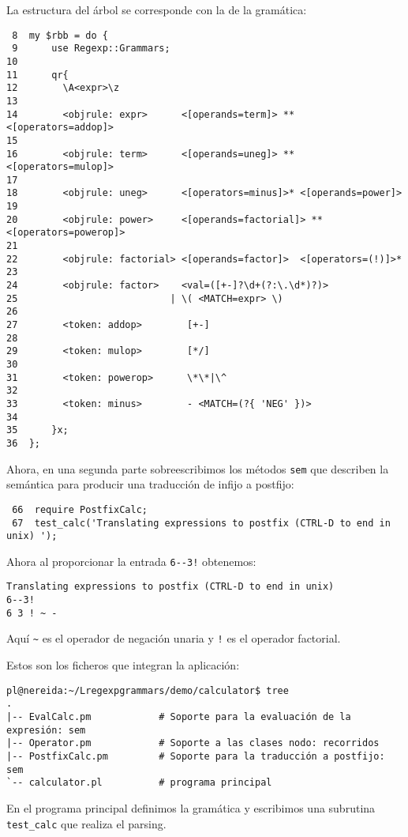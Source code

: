 La estructura del árbol se corresponde con la de la gramática:
\begin{verbatim}
 8  my $rbb = do {
 9      use Regexp::Grammars;
10
11      qr{
12        \A<expr>\z
13
14        <objrule: expr>      <[operands=term]> ** <[operators=addop]>
15
16        <objrule: term>      <[operands=uneg]> ** <[operators=mulop]>
17
18        <objrule: uneg>      <[operators=minus]>* <[operands=power]>
19
20        <objrule: power>     <[operands=factorial]> ** <[operators=powerop]>
21
22        <objrule: factorial> <[operands=factor]>  <[operators=(!)]>*
23
24        <objrule: factor>    <val=([+-]?\d+(?:\.\d*)?)>
25                           | \( <MATCH=expr> \)
26
27        <token: addop>        [+-]
28
29        <token: mulop>        [*/]
30
31        <token: powerop>      \*\*|\^
32
33        <token: minus>        - <MATCH=(?{ 'NEG' })>
34
35      }x;
36  };
\end{verbatim}

Ahora, en una segunda parte sobreescribimos los métodos
\verb|sem| que describen la semántica para producir una traducción
de infijo a postfijo:
\begin{verbatim}
 66  require PostfixCalc;
 67  test_calc('Translating expressions to postfix (CTRL-D to end in unix) ');
\end{verbatim}
Ahora al proporcionar la entrada \verb|6--3!| obtenemos:
\begin{verbatim}
Translating expressions to postfix (CTRL-D to end in unix)
6--3!
6 3 ! ~ -
\end{verbatim}
Aquí \verb|~| es el operador de negación unaria y \verb|!| es el operador
factorial.


Estos son los ficheros que integran la aplicación:

\begin{verbatim}
pl@nereida:~/Lregexpgrammars/demo/calculator$ tree
.
|-- EvalCalc.pm            # Soporte para la evaluación de la expresión: sem
|-- Operator.pm            # Soporte a las clases nodo: recorridos
|-- PostfixCalc.pm         # Soporte para la traducción a postfijo: sem
`-- calculator.pl          # programa principal
\end{verbatim}


En el programa principal definimos la gramática
y escribimos una subrutina \verb|test_calc|
que realiza el parsing. 

